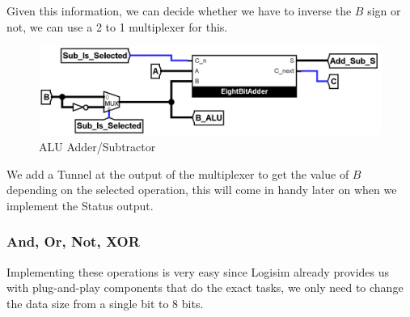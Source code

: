 \documentclass{article}
\begin{document}
 Given this information, we can decide whether we have to inverse the $B$ sign or not, we can use a 2 to 1 multiplexer for this.

  \begin{figure}[H]
     \centering
     \includegraphics[width=.8\textwidth]{circuits/AdderSubtractor.png}
     \caption{ALU Adder/Subtractor}
     \label{fig:add_sub}
 \end{figure}

 We add a Tunnel at the output of the multiplexer to get the value of $B$ depending on the selected operation, this will come in handy later on when we implement the Status output.


\subsubsection{And, Or, Not, XOR}

Implementing these operations is very easy since Logisim already provides us with plug-and-play components that do the exact tasks, we only need to change the data size from a single bit to 8 bits.
\end{document}
